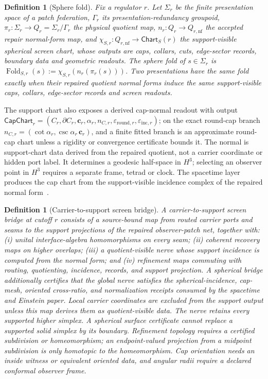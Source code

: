 \documentclass[11pt]{article}
\newtheorem{definition}[theorem]{Definition}
\theoremstyle{remark}
\theoremstyle{plain}
\begin{document}
\begin{definition}[Sphere fold]\label{def:sphere-fold}
Fix a regulator \(r\). Let \(\Sigma_r\) be the finite presentation space of a
patch federation, \(\Gamma_r\) its presentation-redundancy groupoid,
\(\pi_r:\Sigma_r\to Q_r=\Sigma_r/\Gamma_r\) the physical quotient map,
\(n_r:Q_r\to Q_{r,\mathrm{nf}}\) the accepted repair normal-form map, and
\(\chi_{S,r}:Q_{r,\mathrm{nf}}\to\mathsf{Chart}_S(r)\) the support-visible
spherical screen chart, whose outputs are caps, collars, cuts, edge-sector
records, boundary data and geometric readouts. The sphere fold of
\(s\in\Sigma_r\) is
\(\operatorname{Fold}_{S,r}(s):=\chi_{S,r}(n_r(\pi_r(s)))\). Two
presentations have the same fold exactly when their repaired quotient normal
forms induce the same support-visible caps, collars, edge-sector records and
screen readouts.
\end{definition}

The support chart also exposes a derived cap-normal readout with output
\(\mathsf{CapChart}_r=(C_r,\partial C_r,\mathbf c_r,\alpha_r,n_{C,r},
\varepsilon_{\mathrm{round},r},\varepsilon_{\mathrm{inc},r})\); on the exact
round-cap branch \(n_{C,r}=(\cot\alpha_r,\csc\alpha_r\,\mathbf c_r)\), and a
finite fitted branch is an approximate round-cap chart unless a rigidity or
convergence certificate bounds it. The normal is support-chart data derived
from the repaired quotient, not a carrier coordinate or hidden port label. It
determines a geodesic half-space in \(H^3\); selecting an observer point in
\(H^3\) requires a separate frame, tetrad or clock. The spacetime layer
produces the cap chart from the support-visible incidence complex of the
repaired normal form~\cite{ophEinstein}.

\begin{definition}[Carrier-to-support screen bridge]\label{def:carrier-support-screen-bridge}
A carrier-to-support screen bridge at cutoff \(r\) consists of a source-bound map from routed
carrier ports and seams to the support projections of the repaired observer-patch net, together
with: (i) unital interface-algebra homomorphisms on every seam; (ii) coherent recovery maps on
higher overlaps; (iii) a quotient-visible nerve whose support incidence is computed from the
normal form; and (iv) refinement maps commuting with routing, quotienting, incidence, records,
and support projection. A spherical bridge additionally certifies that the global nerve satisfies
the spherical-incidence, cap-mesh, oriented cross-ratio, and normalization receipts consumed by
the spacetime and Einstein paper. Local carrier coordinates are excluded from the support output unless this map
derives them as quotient-visible data.
The nerve retains every supported higher simplex. A spherical surface
certificate cannot replace a supported solid simplex by its boundary.
Refinement topology requires a certified subdivision or homeomorphism; an
endpoint-valued projection from a midpoint subdivision is only homotopic to
the homeomorphism. Cap orientation needs an inside witness or equivalent
oriented data, and angular radii require a declared conformal observer frame.
\end{definition}
\end{document}
